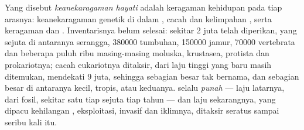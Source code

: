 \begin{definition}\label{def:b1:classifying-biodiversity:biodiversity}
Yang disebut \emph{keanekaragaman hayati} adalah keragaman kehidupan
pada tiap arasnya: keanekaragaman genetik di dalam , cacah dan
kelimpahan , serta keragaman  dan .
Inventarisnya belum selesai: sekitar \num{2} juta  telah
diperikan, yang sejuta di antaranya serangga, \num{380000} tumbuhan,
\num{150000} jamur, \num{70000} vertebrata dan beberapa puluh ribu
masing-masing moluska, krustasea, protista dan prokariotnya; cacah
 eukariotnya ditaksir, dari laju  tinggi yang baru masih
ditemukan, mendekati \num{9} juta, sehingga sebagian besar 
tak bernama, dan sebagian besar di antaranya kecil, tropis, atau
keduanya.  selalu \emph{punah} --- laju latarnya, dari fosil,
sekitar satu  tiap sejuta tiap tahun --- dan laju sekarangnya,
yang dipacu kehilangan , eksploitasi,  invasif dan
iklimnya, ditaksir seratus sampai seribu kali itu.
\end{definition}

